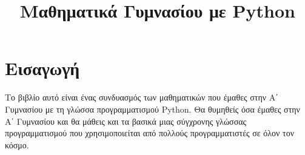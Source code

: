 \documentclass[b5paper,11pt,twoside,openleft]{memoir}
\begin{document}
\title{%
Μαθηματικά Γυμνασίου με Python}

\author{}
\maketitle
\thispagestyle{empty}
\chapter*	{Εισαγωγή}
Το βιβλίο αυτό είναι ένας συνδυασμός των μαθηματικών που έμαθες στην Α΄ Γυμνασίου με τη γλώσσα προγραμματισμού Python. Θα θυμηθείς όσα έμαθες στην Α΄ Γυμνασίου και θα μάθεις και τα βασικά μιας σύγχρονης γλώσσας προγραμματισμού που χρησιμοποιείται από πολλούς προγραμματιστές σε όλον τον κόσμο.
%
%
%
%
%
%
%
%
\end{document}

